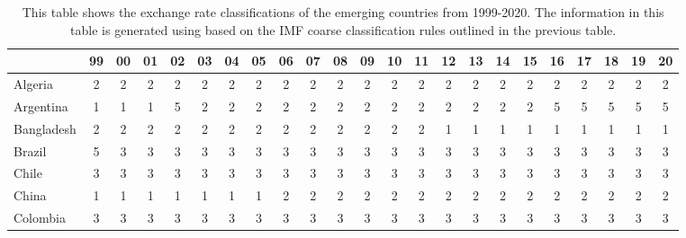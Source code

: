 \documentclass{article}
\begin{document}
\begin{table}[htbp]
  \centering
  \begin{adjustwidth}{-3cm}{}
  \caption{This table shows the exchange rate classifications of the emerging countries from 1999-2020. The information in this table is generated using based on the IMF coarse classification rules outlined in the previous table.}
    \begin{tabular}{lcccccccccccccccccccccc}
    \toprule
          & \multicolumn{1}{r}{99} & \multicolumn{1}{l}{00} & \multicolumn{1}{l}{01} & \multicolumn{1}{l}{02} & \multicolumn{1}{l}{03} & \multicolumn{1}{l}{04} & \multicolumn{1}{l}{05} & \multicolumn{1}{l}{06} & \multicolumn{1}{l}{07} & \multicolumn{1}{l}{08} & \multicolumn{1}{l}{09} & \multicolumn{1}{l}{10} & \multicolumn{1}{l}{11} & \multicolumn{1}{l}{12} & \multicolumn{1}{l}{13} & \multicolumn{1}{l}{14} & \multicolumn{1}{l}{15} & \multicolumn{1}{l}{16} & \multicolumn{1}{l}{17} & \multicolumn{1}{l}{18} & \multicolumn{1}{l}{19} & \multicolumn{1}{l}{20} \\
    \midrule
    Algeria & 2     & 2     & 2     & 2     & 2     & 2     & 2     & 2     & 2     & 2     & 2     & 2     & 2     & 2     & 2     & 2     & 2     & 2     & 2     & 2     & 2     & 2 \\
    Argentina & 1     & 1     & 1     & 5     & 2     & 2     & 2     & 2     & 2     & 2     & 2     & 2     & 2     & 2     & 2     & 2     & 2     & 5     & 5     & 5     & 5     & 5 \\
    Bangladesh & 2     & 2     & 2     & 2     & 2     & 2     & 2     & 2     & 2     & 2     & 2     & 2     & 2     & 1     & 1     & 1     & 1     & 1     & 1     & 1     & 1     & 1 \\
    Brazil & 5     & 3     & 3     & 3     & 3     & 3     & 3     & 3     & 3     & 3     & 3     & 3     & 3     & 3     & 3     & 3     & 3     & 3     & 3     & 3     & 3     & 3 \\
    Chile & 3     & 3     & 3     & 3     & 3     & 3     & 3     & 3     & 3     & 3     & 3     & 3     & 3     & 3     & 3     & 3     & 3     & 3     & 3     & 3     & 3     & 3 \\
    China & 1     & 1     & 1     & 1     & 1     & 1     & 1     & 2     & 2     & 2     & 2     & 2     & 2     & 2     & 2     & 2     & 2     & 2     & 2     & 2     & 2     & 2 \\
    Colombia & 3     & 3     & 3     & 3     & 3     & 3     & 3     & 3     & 3     & 3     & 3     & 3     & 3     & 3     & 3     & 3     & 3     & 3     & 3     & 3     & 3     & 3 \\

\end{tabular}
\end{adjustwidth}
\end{table}
\end{document}
